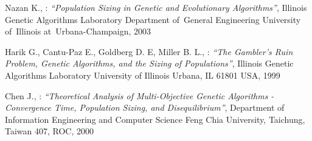 \begin{thebibliography}{99}
	Nazan K., : \textit{``Population Sizing in Genetic and Evolutionary Algorithms''},
	 Illinois Genetic Algorithms Laboratory Department of~General Engineering University 
	 of~Illinois at~Urbana-Champaign, 2003

	Harik G., Cantu-Paz E., Goldberg D. E, Miller B. L., : \textit{``The Gambler’s Ruin Problem, Genetic Algorithms, and the Sizing of Populations''}, 
	Illinois Genetic Algorithms Laboratory University of Illinois Urbana, IL
	61801 USA, 1999

	Chen J., : \textit{``Theoretical Analysis of Multi-Objective Genetic
Algorithms - Convergence Time, Population Sizing, and Disequilibrium''}, 
Department of Information Engineering and Computer Science Feng Chia University,
Taichung, Taiwan 407, ROC, 2000

\end{thebibliography}
\newpage
\listoffigures
\listoftables

